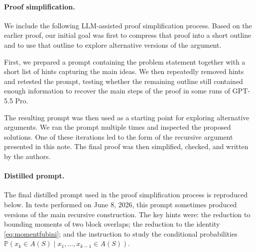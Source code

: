 \documentclass[11pt]{article}
\newcommand{\Prb}{\mathbb P}
\newcommand{\1}{\mathbf 1}
\theoremstyle{plain}
\theoremstyle{remark}
\begin{document}
\paragraph{Proof simplification.}
We include the following LLM-assisted proof simplification process.  Based on the earlier proof, our initial goal was first to compress that proof into a short outline and to use that outline to explore alternative versions of the argument.

First, we prepared a prompt containing the problem statement together with a short list of hints capturing the main ideas.  We then repeatedly removed hints and retested the prompt, testing whether the remaining outline still contained enough information to recover the main steps of the proof in some runs of GPT-5.5 Pro. 

The resulting prompt was then used as a starting point for exploring alternative arguments.  We ran the prompt multiple times and inspected the proposed solutions.  One of these iterations led to the form of the recursive argument presented in this note.  The final proof was then simplified, checked, and written by the authors. 

\paragraph{Distilled prompt.}
The final distilled prompt used in the proof simplification process is reproduced below.  In tests performed on June 8, 2026, this prompt sometimes produced versions of the main recursive construction.  The key hints were: the reduction to bounding moments of two block overlaps; the reduction to the identity \eqref{eq:momentfubini}; and the instruction to study the conditional probabilities
$
\Prb\left(x_k\in A(S)\mid x_1,\dots,x_{k-1}\in A(S)\right).
$
\end{document}
